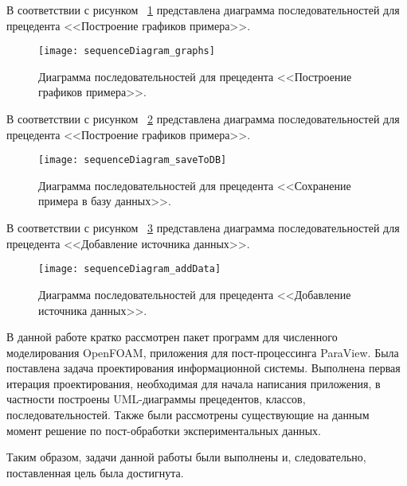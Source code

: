 \documentclass[14pt]{extreport}
\begin{document}
В соответствии с рисунком ~\ref{fig9} представлена диаграмма последовательностей для прецедента <<Построение графиков примера>>.

\begin{figure}[H]
\centerline{\texttt{[image: sequenceDiagram\_graphs]}}
\caption{Диаграмма последовательностей для прецедента <<Построение графиков примера>>.}
\label{fig9}
\end{figure}

В соответствии с рисунком ~\ref{fig10} представлена диаграмма последовательностей для прецедента <<Построение графиков примера>>.

\begin{figure}[H]
\centerline{\texttt{[image: sequenceDiagram\_saveToDB]}}
\caption{Диаграмма последовательностей для прецедента <<Сохранение примера в базу данных>>.}
\label{fig10}
\end{figure}

В соответствии с рисунком ~\ref{fig11} представлена диаграмма последовательностей для прецедента <<Добавление источника данных>>.

\begin{figure}[H]
\centerline{\texttt{[image: sequenceDiagram\_addData]}}
\caption{Диаграмма последовательностей для прецедента <<Добавление источника 
данных>>.}
\label{fig11}
\end{figure}

\conclusions

В данной работе кратко рассмотрен пакет программ для численного моделирования OpenFOAM, приложения для пост-процессинга ParaView. Была поставлена задача проектирования информационной системы. Выполнена первая итерация проектирования, необходимая для начала написания приложения, в частности построены UML-диаграммы прецедентов, классов, последовательностей. Также были рассмотрены существующие на данным момент решение по пост-обработки экспериментальных данных.

Таким образом, задачи данной работы были выполнены и, следовательно, поставленная цель была достигнута. 




% 
\end{document}
